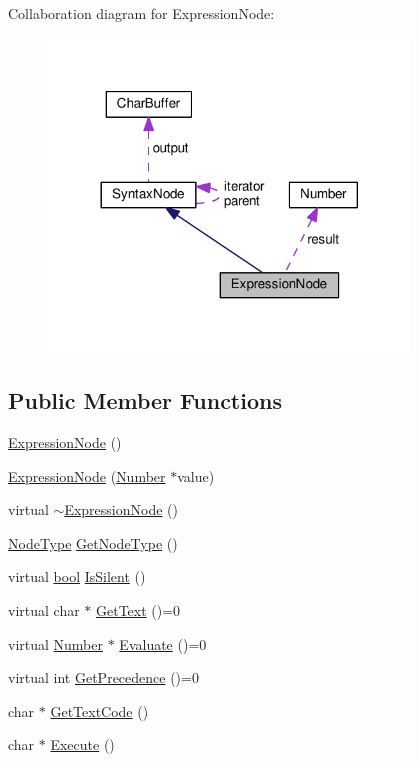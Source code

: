Collaboration diagram for Expression\+Node\+:
\nopagebreak
\begin{figure}[H]
\begin{center}
\leavevmode
\includegraphics[width=272pt]{d9/dde/classExpressionNode__coll__graph}
\end{center}
\end{figure}
\subsection*{Public Member Functions}
\begin{DoxyCompactItemize}
\item 
\hyperlink{classExpressionNode_adc8888de5329d356224c8a93f3ce2b75}{Expression\+Node} ()
\item 
\hyperlink{classExpressionNode_a5d67579dd6c9777a18455a1360f29841}{Expression\+Node} (\hyperlink{structNumber}{Number} $\ast$value)
\item 
virtual \hyperlink{classExpressionNode_aa834d6d0e96a958d22609dad612b54b0}{$\sim$\+Expression\+Node} ()
\item 
\hyperlink{nodes_8h_acac9cbaeea226ed297804c012dc12b16}{Node\+Type} \hyperlink{classExpressionNode_aaa0ecd3971c182bbc605623b83afc519}{Get\+Node\+Type} ()
\item 
virtual \hyperlink{platform_8h_a1062901a7428fdd9c7f180f5e01ea056}{bool} \hyperlink{classExpressionNode_adc58a4c102b7fa18e9c3a0be361b0663}{Is\+Silent} ()
\item 
virtual char $\ast$ \hyperlink{classExpressionNode_a0bbf243108a14eaf963a8161ffd8eb92}{Get\+Text} ()=0
\item 
virtual \hyperlink{structNumber}{Number} $\ast$ \hyperlink{classExpressionNode_a64975d4dc37742228bd522f6204537f7}{Evaluate} ()=0
\item 
virtual int \hyperlink{classExpressionNode_a161b9ea0b79bbfc101d6f687c8481ddd}{Get\+Precedence} ()=0
\item 
char $\ast$ \hyperlink{classExpressionNode_abb495de256b8c9a1c7bb61910fab25ab}{Get\+Text\+Code} ()
\item 
char $\ast$ \hyperlink{classExpressionNode_a923ac9b73f5568dd6bc65620d549c4ce}{Execute} ()
\end{DoxyCompactItemize}
